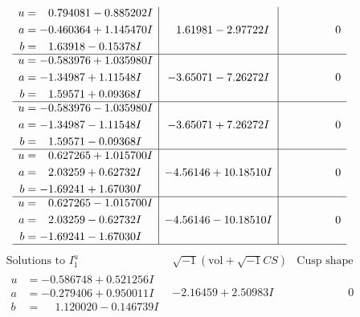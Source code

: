 \documentclass[1p]{elsarticle_modified}
\theoremstyle{definition}
\newcommand{\I}{\sqrt{-1}}
\begin{document}
$$\begin{array}{c|c|c}
\begin{aligned}
u &= \phantom{-}0.794081 - 0.885202 I \\
a &= -0.460364 + 1.145470 I \\
b &= \phantom{-}1.63918 - 0.15378 I\end{aligned}
 & \phantom{-}1.61981 - 2.97722 I & \phantom{-0.000000 } 0 \\ \hline\begin{aligned}
u &= -0.583976 + 1.035980 I \\
a &= -1.34987 + 1.11548 I \\
b &= \phantom{-}1.59571 + 0.09368 I\end{aligned}
 & -3.65071 - 7.26272 I & \phantom{-0.000000 } 0 \\ \hline\begin{aligned}
u &= -0.583976 - 1.035980 I \\
a &= -1.34987 - 1.11548 I \\
b &= \phantom{-}1.59571 - 0.09368 I\end{aligned}
 & -3.65071 + 7.26272 I & \phantom{-0.000000 } 0 \\ \hline\begin{aligned}
u &= \phantom{-}0.627265 + 1.015700 I \\
a &= \phantom{-}2.03259 + 0.62732 I \\
b &= -1.69241 + 1.67030 I\end{aligned}
 & -4.56146 + 10.18510 I & \phantom{-0.000000 } 0 \\ \hline\begin{aligned}
u &= \phantom{-}0.627265 - 1.015700 I \\
a &= \phantom{-}2.03259 - 0.62732 I \\
b &= -1.69241 - 1.67030 I\end{aligned}
 & -4.56146 - 10.18510 I & \phantom{-0.000000 } 0\\
 \hline 
 \end{array}$$\newpage$$\begin{array}{c|c|c}  
\text{Solutions to }I^u_{1}& \I (\text{vol} + \sqrt{-1}CS) & \text{Cusp shape}\\
 \hline 
\begin{aligned}
u &= -0.586748 + 0.521256 I \\
a &= -0.279406 + 0.950011 I \\
b &= \phantom{-}1.120020 - 0.146739 I\end{aligned}
 & -2.16459 + 2.50983 I & \phantom{-0.000000 } 0 \\ \hline\begin{aligned}

\end{aligned}
\end{array}$$
\end{document}
